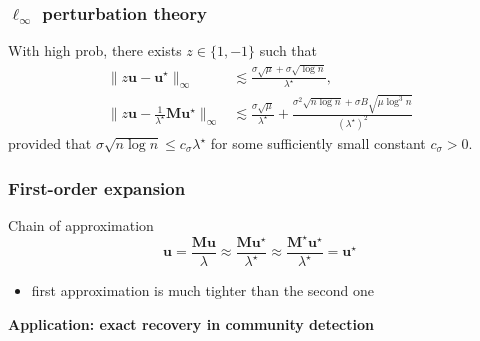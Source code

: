 \documentclass[compress,
mathserif,wide,%
]{beamer}
\begin{document}
\begin{frame}
	\frametitle{$\ell_{\infty}$ perturbation theory}
\begin{theorem}
	With high prob, there exists $z \in \{1, -1\}$ such that 
%
\begin{subequations}
\label{eq:UsgnH-Ustar-MUstar-bound-theorem-general}
\begin{align}
\big\|z\bm{u}-\bm{u}^{\star}\big\|_{\infty}  &\lesssim \frac{\sigma\sqrt{\mu}+\sigma\sqrt{\log n}}{ \lambda^{\star} },
\label{eq:UsgnH-Ustar-bound-theorem-general}\\
\big\|z\bm{u}-\frac{1}{\lambda^{\star}}\bm{M}\bm{u}^{\star}\big\|_{\infty} &\lesssim \frac{\sigma\sqrt{\mu}}{ \lambda^{\star} }+ \frac{\sigma^{2}\sqrt{n\log n}+\sigma B\sqrt{\mu \log^{3}n}}{(\lambda^{\star})^{2} }
\label{eq:UsgnH-MUstar-bound-theorem-general}
\end{align}
\end{subequations}
%
provided that $\sigma \sqrt{n \log n}  \leq c_{\sigma}\lambda^{\star} $ for some sufficiently small constant $c_{\sigma}>0$. 
\end{theorem}



\end{frame}

\begin{frame}
	\frametitle{First-order expansion}
	
	Chain of approximation
	\[
	\bm{u} = \frac{\bm{M} \bm{u}}{\lambda} \approx \frac{\bm{M} \bm{u}^\star}{ \lambda^\star} \approx \frac{\bm{M}^\star \bm{u}^\star}{ \lambda^\star} = \bm{u^\star}
	\]
	\vfill
	\begin{itemize}
		\item first approximation is much tighter than the second one
	\end{itemize}
\end{frame}

\begin{frame}[plain]
\vfill
\centering
{\large \bf Application: exact recovery in community detection}
\vfill
\end{frame}
\end{document}
